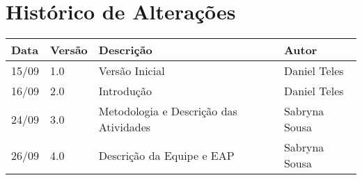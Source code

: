 \chapter*{Histórico de Alterações}

\begin{table}[!htpd]
\centering
\label{my-label}
\begin{tabular}{|l|l|l|l|}
\hline
\textbf{Data} & \textbf{Versão} & \textbf{Descrição} & \textbf{Autor} \\ \hline
15/09         & 1.0             & Versão Inicial     & Daniel Teles   \\ \hline
16/09         & 2.0             & Introdução         & Daniel Teles   \\ \hline
24/09         & 3.0             & Metodologia e Descrição das Atividades       & Sabryna Sousa  \\ \hline
26/09         & 4.0             & Descrição da Equipe e EAP       & Sabryna Sousa  \\ \hline
\end{tabular}
\end{table}

\cleardoublepage
